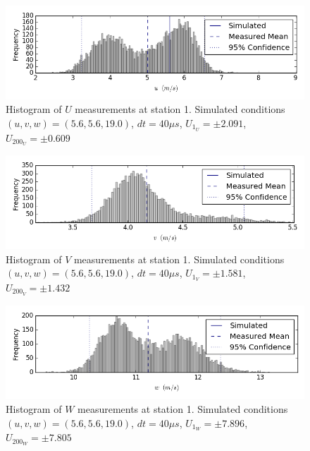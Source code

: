 \begin{figure}[H]
\centering
\includegraphics[width=6in]{figs/Ely_May28th01002/uncertainty_Ely_May28th01002_U}
\caption{Histogram of $U$ measurements at station 1. Simulated conditions $(u,v,w)=(5.6, 5.6, 19.0)$, $dt=40 \mu s$, $U_1_U=\pm 2.091$, $U_200_U=\pm 0.609$}
\label{fig:uncertainty_Ely_May28th01002_U}
\end{figure}


\begin{figure}[H]
\centering
\includegraphics[width=6in]{figs/Ely_May28th01002/uncertainty_Ely_May28th01002_V}
\caption{Histogram of $V$ measurements at station 1. Simulated conditions $(u,v,w)=(5.6, 5.6, 19.0)$, $dt=40 \mu s$, $U_1_V=\pm 1.581$, $U_200_V=\pm 1.432$}
\label{fig:uncertainty_Ely_May28th01002_V}
\end{figure}


\begin{figure}[H]
\centering
\includegraphics[width=6in]{figs/Ely_May28th01002/uncertainty_Ely_May28th01002_W}
\caption{Histogram of $W$ measurements at station 1. Simulated conditions $(u,v,w)=(5.6, 5.6, 19.0)$, $dt=40 \mu s$, $U_1_W=\pm 7.896$, $U_200_W=\pm 7.805$}
\label{fig:uncertainty_Ely_May28th01002_W}
\end{figure}


